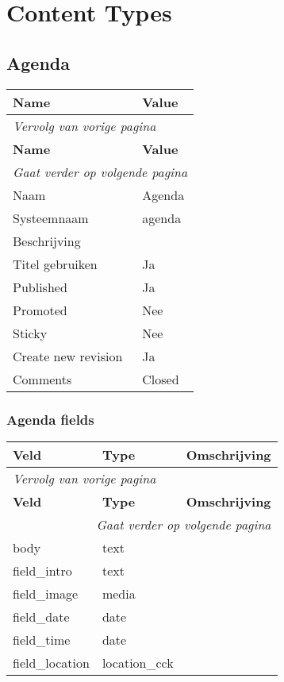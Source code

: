 \section{Content Types}

\subsection{Agenda}
\label{sec:content-agenda}
  \begin{longtable}{| p{7.50cm}|p{7.50cm}|}
  \hline
  \rowcolor{tableheader}
  \textbf{Name} & \textbf{Value}  \tabularnewline
  \hline
\endfirsthead
\multicolumn{2}{l}{\textit{Vervolg van vorige pagina}} \\
\hline
\rowcolor{tableheader}
  \textbf{Name} & \textbf{Value}  \tabularnewline
  \hline
\hline
\endhead
\multicolumn{2}{r}{\textit{Gaat verder op volgende pagina}} \\
\endfoot
\hline
\endlastfoot
  Naam & Agenda  \tabularnewline
  \hline
  Systeemnaam & agenda  \tabularnewline
  \hline
  Beschrijving &   \tabularnewline
  \hline
  Titel gebruiken & Ja  \tabularnewline
  \hline
  Published & Ja  \tabularnewline
  \hline
  Promoted & Nee  \tabularnewline
  \hline
  Sticky & Nee  \tabularnewline
  \hline
  Create new revision & Ja  \tabularnewline
  \hline
  Comments & Closed  \tabularnewline
  \hline
  \end{longtable}

\subsubsection{Agenda fields}
  \begin{longtable}{| p{5.00cm}|p{5.00cm}|p{5.00cm}|}
  \hline
  \rowcolor{tableheader}
  \textbf{Veld} & \textbf{Type} & \textbf{Omschrijving}  \tabularnewline
  \hline
\endfirsthead
\multicolumn{3}{l}{\textit{Vervolg van vorige pagina}} \\
\hline
\rowcolor{tableheader}
  \textbf{Veld} & \textbf{Type} & \textbf{Omschrijving}  \tabularnewline
  \hline
\hline
\endhead
\multicolumn{3}{r}{\textit{Gaat verder op volgende pagina}} \\
\endfoot
\hline
\endlastfoot
  body & text &   \tabularnewline
  \hline
  field\_intro & text &   \tabularnewline
  \hline
  field\_image & media &   \tabularnewline
  \hline
  field\_date & date &   \tabularnewline
  \hline
  field\_time & date &   \tabularnewline
  \hline
  field\_location & location\_cck &   \tabularnewline
  \hline
  \end{longtable}

